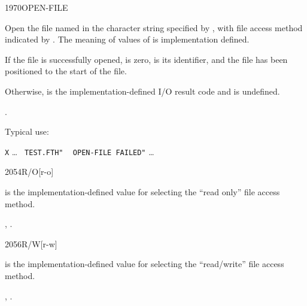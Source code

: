 \begin{worddef}{1970}{OPEN-FILE}
\item {}

	Open the file named in the character string specified by
	, with file access method indicated by
	. The meaning of values of  is
	implementation 	defined.

	If the file is successfully opened,  is zero,
	 is its identifier, and the file has been
	positioned to the start of the file.

	Otherwise,  is the implementation-defined I/O
	result code and  is undefined.

\see {}.

	\begin{rationale} %
		Typical use:

		\tab \word[core]{:} \texttt{X} {\ldots}
				 \texttt{ TEST.FTH"} 
				~  \texttt{OPEN-FILE FAILED"}
			{\ldots} \word[core]{;}
	\end{rationale}
\end{worddef}


\begin{worddef}{2054}{R/O}[r-o]
\item {}

	 is the implementation-defined value for selecting
	the ``read only'' file access method.

\see {},
	.
\end{worddef}


\begin{worddef}{2056}{R/W}[r-w]
\item {}

	 is the implementation-defined value for selecting
	the ``read/write'' file access method.

\see {},
	.
\end{worddef}


